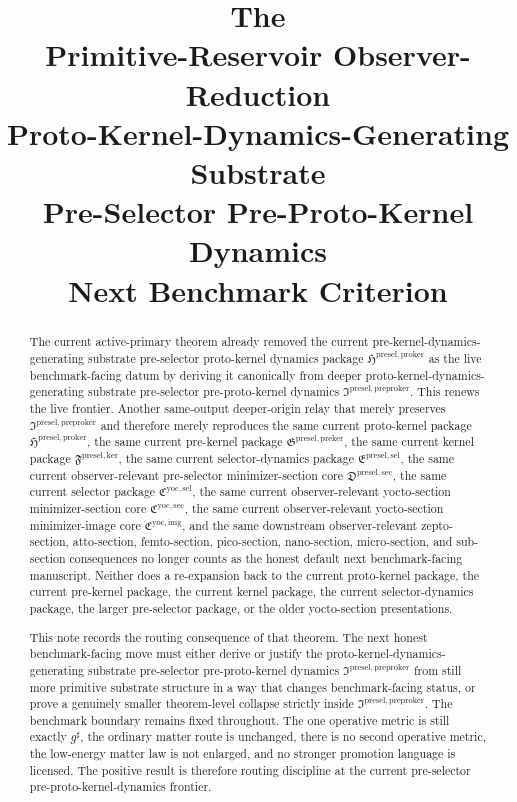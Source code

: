 \documentclass[11pt]{article}
\title{\textbf{The \TheoryName{}}\\[0.4em]
\large Primitive-Reservoir Observer-Reduction\\
\large Proto-Kernel-Dynamics-Generating Substrate\\
\large Pre-Selector Pre-Proto-Kernel Dynamics\\
\large Next Benchmark Criterion}
\author{}
\date{}
\newcommand{\CompletedMetric}{g^{\sharp}}
\newcommand{\PreProtoKernelPackage}{\mathfrak I^{\mathrm{presel,preproker}}}
\newcommand{\ProtoKernelPackage}{\mathfrak H^{\mathrm{presel,proker}}}
\newcommand{\PreKernelPackage}{\mathfrak G^{\mathrm{presel,preker}}}
\newcommand{\KernelPackage}{\mathfrak F^{\mathrm{presel,ker}}}
\newcommand{\PreSectionSelectorPackage}{\mathfrak E^{\mathrm{presel,sel}}}
\newcommand{\PreSelectorMinSectionCore}{\mathfrak D^{\mathrm{presel,sec}}}
\newcommand{\YoctoSelectorPackage}{\mathfrak C^{\mathrm{yoc,sel}}}
\newcommand{\YoctoImageCore}{\mathfrak C^{\mathrm{yoc,img}}}
\newcommand{\YoctoMinSectionCore}{\mathfrak C^{\mathrm{yoc,sec}}}
\begin{document}
\maketitle

\begin{abstract}
The current active-primary theorem already removed the current pre-kernel-dynamics-generating substrate pre-selector proto-kernel dynamics package \(\ProtoKernelPackage\) as the live benchmark-facing datum by deriving it canonically from deeper proto-kernel-dynamics-generating substrate pre-selector pre-proto-kernel dynamics \(\PreProtoKernelPackage\). This renews the live frontier. Another same-output deeper-origin relay that merely preserves \(\PreProtoKernelPackage\) and therefore merely reproduces the same current proto-kernel package \(\ProtoKernelPackage\), the same current pre-kernel package \(\PreKernelPackage\), the same current kernel package \(\KernelPackage\), the same current selector-dynamics package \(\PreSectionSelectorPackage\), the same current observer-relevant pre-selector minimizer-section core \(\PreSelectorMinSectionCore\), the same current selector package \(\YoctoSelectorPackage\), the same current observer-relevant yocto-section minimizer-section core \(\YoctoMinSectionCore\), the same current observer-relevant yocto-section minimizer-image core \(\YoctoImageCore\), and the same downstream observer-relevant zepto-section, atto-section, femto-section, pico-section, nano-section, micro-section, and sub-section consequences no longer counts as the honest default next benchmark-facing manuscript. Neither does a re-expansion back to the current proto-kernel package, the current pre-kernel package, the current kernel package, the current selector-dynamics package, the larger pre-selector package, or the older yocto-section presentations.

This note records the routing consequence of that theorem. The next honest benchmark-facing move must either derive or justify the proto-kernel-dynamics-generating substrate pre-selector pre-proto-kernel dynamics \(\PreProtoKernelPackage\) from still more primitive substrate structure in a way that changes benchmark-facing status, or prove a genuinely smaller theorem-level collapse strictly inside \(\PreProtoKernelPackage\). The benchmark boundary remains fixed throughout. The one operative metric is still exactly \(\CompletedMetric\), the ordinary matter route is unchanged, there is no second operative metric, the low-energy matter law is not enlarged, and no stronger promotion language is licensed. The positive result is therefore routing discipline at the current pre-selector pre-proto-kernel-dynamics frontier.
\end{abstract}
\end{document}
